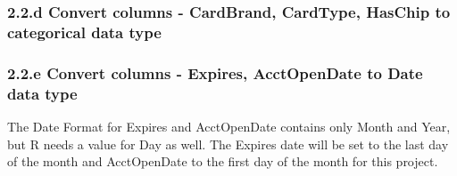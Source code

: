 \documentclass[
]{article}
\newenvironment{Shaded}{\begin{snugshade}}{\end{snugshade}}
\newcommand{\DecValTok}[1]{\textcolor[rgb]{0.00,0.00,0.81}{#1}}
\newcommand{\FunctionTok}[1]{\textcolor[rgb]{0.13,0.29,0.53}{\textbf{#1}}}
\newcommand{\NormalTok}[1]{#1}
\newcommand{\OtherTok}[1]{\textcolor[rgb]{0.56,0.35,0.01}{#1}}
\newcommand{\SpecialCharTok}[1]{\textcolor[rgb]{0.81,0.36,0.00}{\textbf{#1}}}
\newcommand{\StringTok}[1]{\textcolor[rgb]{0.31,0.60,0.02}{#1}}
\begin{document}
\subsubsection{2.2.d Convert columns - CardBrand, CardType, HasChip to
categorical data
type}\label{d-convert-columns---cardbrand-cardtype-haschip-to-categorical-data-type}

\begin{Shaded}
\end{Shaded}

\subsubsection{2.2.e Convert columns - Expires, AcctOpenDate to Date
data
type}\label{e-convert-columns---expires-acctopendate-to-date-data-type}

The Date Format for Expires and AcctOpenDate contains only Month and
Year, but R needs a value for Day as well. The Expires date will be set
to the last day of the month and AcctOpenDate to the first day of the
month for this project.

\begin{Shaded}
\end{Shaded}
\end{document}
